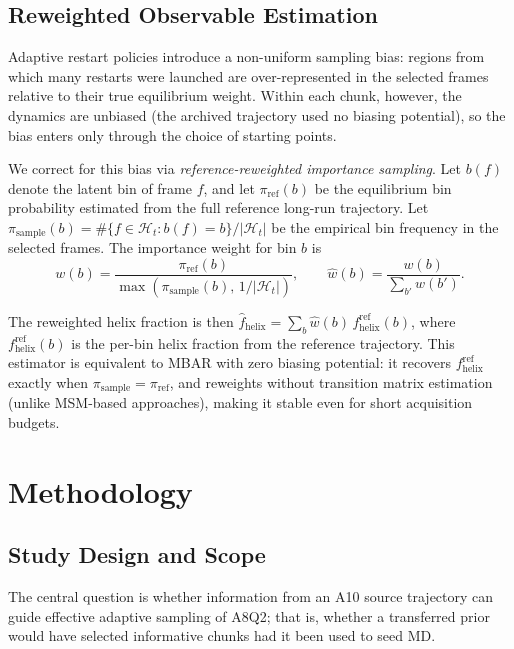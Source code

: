 \subsection{Reweighted Observable Estimation}
\label{sec:theory_reweight}

Adaptive restart policies introduce a non-uniform sampling bias: regions from which many restarts were launched are over-represented in the selected frames relative to their true equilibrium weight.
Within each chunk, however, the dynamics are unbiased (the archived trajectory used no biasing potential), so the bias enters only through the choice of starting points.

We correct for this bias via \emph{reference-reweighted importance sampling}.
Let $b(f)$ denote the latent bin of frame $f$, and let $\pi_{\mathrm{ref}}(b)$ be the equilibrium bin probability estimated from the full reference long-run trajectory.
Let $\pi_{\mathrm{sample}}(b)=\#\{f\in\mathcal{H}_t: b(f)=b\}/|\mathcal{H}_t|$ be the empirical bin frequency in the selected frames.
The importance weight for bin $b$ is
\begin{equation}
    w(b) = \frac{\pi_{\mathrm{ref}}(b)}{\max\!\left(\pi_{\mathrm{sample}}(b),\, 1/|\mathcal{H}_t|\right)},
    \qquad \hat{w}(b) = \frac{w(b)}{\sum_{b'}w(b')}.
    \label{eq:reweight}
\end{equation}
The reweighted helix fraction is then $\hat{f}_{\mathrm{helix}}=\sum_b \hat{w}(b)\,f_{\mathrm{helix}}^{\mathrm{ref}}(b)$, where $f_{\mathrm{helix}}^{\mathrm{ref}}(b)$ is the per-bin helix fraction from the reference trajectory.
This estimator is equivalent to MBAR with zero biasing potential: it recovers $f_{\mathrm{helix}}^{\mathrm{ref}}$ exactly when $\pi_{\mathrm{sample}}=\pi_{\mathrm{ref}}$, and reweights without transition matrix estimation (unlike MSM-based approaches), making it stable even for short acquisition budgets.

\section{Methodology}

\subsection{Study Design and Scope}

The central question is whether information from an A10 source trajectory can guide effective adaptive sampling of A8Q2; that is, whether a transferred prior would have selected informative chunks had it been used to seed MD.

